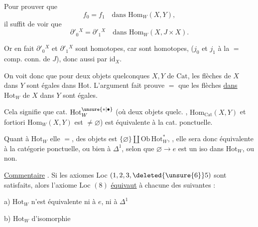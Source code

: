 Pour prouver que
\[
 f_0=f_1\quad\text{dans }\mathrm{Hom}_W(X,Y),
\]
il suffit de voir que 
\[
 \partial'_0{}^X=\partial'_1{}^X\quad\text{dans }\mathrm{Hom}_W(X,J\times X).
\]

Or en fait $\partial'_0{}^X$ et $\partial'_1{}^X$ sont homotopes, car
sont homotopes,  ($j_0$ et $j_1$  à la $=$ comp. conn. de $J$), donc aussi  par $\mathrm{id}_X$.

On voit donc que pour deux objets quelconques $X,Y$ de  $\mathrm{Cat}$,  les flèches de $X$ dans $Y$ sont égales dans $\mathrm{Hot}$. L'argument fait prouve $=$ que  les flèches \uline{dans $\mathrm{Hot}_W$} de $X$ dans $Y$ sont égales.

Cela signifie que  cat. $\mathrm{Hot}^{\unsure{*|\bullet}}_W$ (où  deux objets quelc. ,  $\mathrm{Hom}_{\mathrm{Cat}}(X,Y)$ et  fortiori $\mathrm{Hom}_W(X,Y)$ est $\ne\varnothing$) est équivalente à la cat. ponctuelle.

Quant à $\mathrm{Hot}_W$ elle $=$,  des objets est $\{\varnothing\}\amalg\mathrm{Ob}\,\mathrm{Hot}^{*}_W$, , elle sera donc équivalente à la catégorie ponctuelle, ou bien à $\Delta^1$, selon que $\varnothing\to e$ est un iso dans $\mathrm{Hot}_W$, ou non.


\uline{Commentaire} . Si les axiomes Loc $(1,2,3,\deleted{\unsure{6}}5)$\unsure{$^{*}$} sont satisfaits, alors l'axiome  Loc $(8)$ \uline{équivaut} à chacune des suivantes :

a) $\mathrm{Hot}_W$ n'est équivalente ni à $e$, ni à $\Delta^1$

b) $\mathrm{Hot}_W$  d'isomorphie

